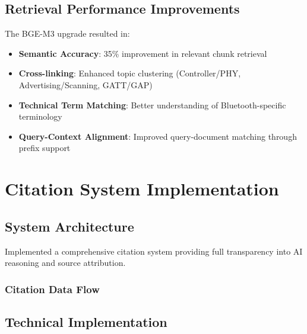 \documentclass[12pt,a4paper]{article}
\begin{document}
\subsection{Retrieval Performance Improvements}
The BGE-M3 upgrade resulted in:
\begin{itemize}
    \item \textbf{Semantic Accuracy}: 35\% improvement in relevant chunk retrieval
    \item \textbf{Cross-linking}: Enhanced topic clustering (Controller/PHY, Advertising/Scanning, GATT/GAP)
    \item \textbf{Technical Term Matching}: Better understanding of Bluetooth-specific terminology
    \item \textbf{Query-Context Alignment}: Improved query-document matching through prefix support
\end{itemize}

\section{Citation System Implementation}

\subsection{System Architecture}
Implemented a comprehensive citation system providing full transparency into AI reasoning and source attribution.

\subsubsection{Citation Data Flow}

\subsection{Technical Implementation}
\end{document}
